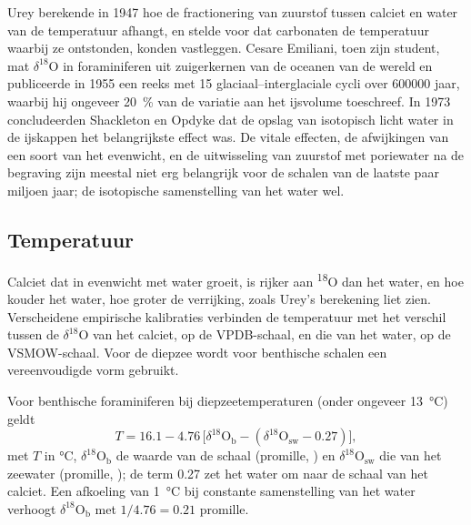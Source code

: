 \begin{history}
Urey berekende in 1947 hoe de fractionering van zuurstof tussen calciet en water van de
temperatuur afhangt, en stelde voor dat carbonaten de temperatuur waarbij ze ontstonden, konden vastleggen. Cesare
Emiliani, toen zijn student, mat $\delta^{18}$O in foraminiferen uit zuigerkernen van de
oceanen van de wereld en publiceerde in 1955 een reeks met 15 glaciaal--interglaciale cycli over
\num{600000} jaar, waarbij hij ongeveer \qty{20}{\percent} van de variatie aan het ijsvolume toeschreef.
In 1973 concludeerden Shackleton en Opdyke dat de opslag van isotopisch licht water in de
ijskappen het belangrijkste effect was. De vitale effecten, de afwijkingen van een soort van het evenwicht,
en de uitwisseling van zuurstof met poriewater na de begraving zijn meestal niet erg belangrijk voor de
schalen van de laatste paar miljoen jaar; de isotopische samenstelling van het water wel.
\end{history}

\subsection*{Temperatuur}

Calciet dat in evenwicht met water groeit, is rijker aan \textsuperscript{18}O dan het water,
en hoe kouder het water, hoe groter de verrijking, zoals Urey's berekening liet zien. Verscheidene
empirische kalibraties verbinden
de temperatuur met het verschil tussen de $\delta^{18}$O van het calciet, op de VPDB-schaal, en
die van het water, op de VSMOW-schaal. Voor de diepzee wordt voor benthische
schalen een vereenvoudigde vorm gebruikt.

\begin{proposition}\label{prop:b2:climate-proxies:benthic}
Voor benthische foraminiferen bij diepzeetemperaturen (onder ongeveer \qty{13}{\celsius}) geldt
\[
  T = 16.1 - 4.76\,\bigl[\delta^{18}\mathrm{O}_{\mathrm{b}} - (\delta^{18}\mathrm{O}_{\mathrm{sw}} -
  0.27)\bigr],
\]
met $T$ in \unit{\celsius}, $\delta^{18}\mathrm{O}_{\mathrm{b}}$ de waarde van de schaal (promille,
) en $\delta^{18}\mathrm{O}_{\mathrm{sw}}$ die van het zeewater (promille, ); de term
0.27 zet het water om naar de schaal van het calciet. Een afkoeling van \qty{1}{\celsius} bij constante
samenstelling van het water verhoogt $\delta^{18}\mathrm{O}_{\mathrm{b}}$ met $1/4.76 = 0.21$ promille.
\end{proposition}
\admitted

